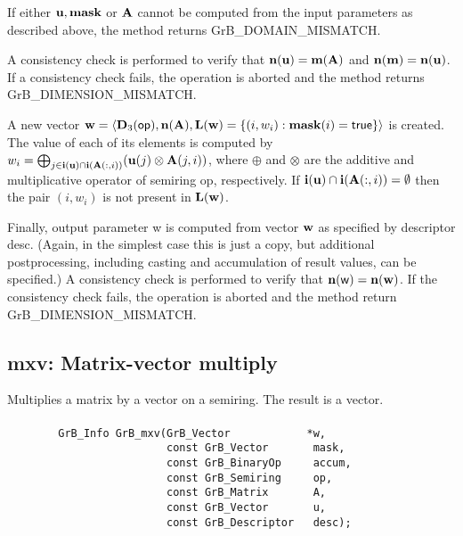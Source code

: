 If either ${\bf u}, {\bf mask}$ or ${\bf A}$ cannot be computed
from the input parameters as described above, the method returns {\sf
GrB\_DOMAIN\_MISMATCH}.

A consistency check is performed to verify that $\bold{n}({\bf u})
= \bold{m}({\bf A})$ and $\bold{n}({\bf m}) =
\bold{n}({\bf u})$. If a consistency check fails, the operation is
aborted and the method returns {\sf GrB\_DIMENSION\_MISMATCH}.

A new vector ${\bf w} = \langle \bold{D}_3({\sf op}),
\bold{n}({\bf A}), \bold{L}({\bf w}) = \{(i,w_i) : {\bf mask}(i)
= {\sf true} \} \rangle$ is created.  The value of each of its elements
is computed by $w_i = \bigoplus_{j \in {\bf i}({\bf u}) \cap
{\bf i}({\bf A}(:,i))} ({\bf u}(j) \otimes {\bf A}(j,i))$,
where $\oplus$ and $\otimes$ are the additive and multiplicative
operator of semiring {\sf op}, respectively.  If ${\bf i}({\bf u})
\cap {\bf i}({\bf A}(:,i)) = \emptyset$ then the pair $(i,w_i)$
is not present in $\bold{L}({\bf w})$.

Finally, output parameter {\sf w} is computed from vector ${\bf w}$
as specified by descriptor {\sf desc}. (Again, in the simplest case this
is just a copy, but additional postprocessing, including casting and
accumulation of result values, can be specified.)  A consistency check is
performed to verify that $\bold{n}({\sf w}) = \bold{n}({\bf w})$. If
the consistency check fails, the operation is aborted and the method
return {\sf GrB\_DIMENSION\_MISMATCH}.



\subsection{{\sf mxv}: Matrix-vector multiply}

Multiplies a matrix by a vector on a semiring. The result is a vector.

\paragraph{\syntax}

\begin{verbatim}
        GrB_Info GrB_mxv(GrB_Vector            *w,
                         const GrB_Vector       mask,
                         const GrB_BinaryOp     accum,
                         const GrB_Semiring     op, 
                         const GrB_Matrix       A,
                         const GrB_Vector       u,
                         const GrB_Descriptor   desc);
\end{verbatim}

